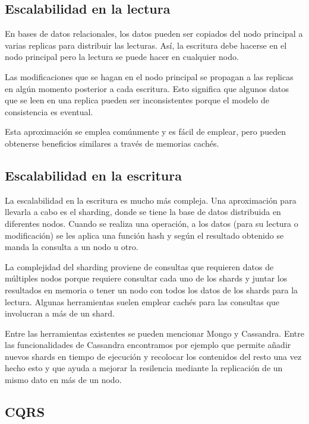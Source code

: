 \documentclass[11pt,a4paper]{article}
\begin{document}
\subsection{Escalabilidad en la lectura}

En bases de datos relacionales, los datos pueden ser copiados del nodo principal a varias replicas para distribuir las lecturas. Así, la escritura debe hacerse en el nodo principal pero la lectura se puede hacer en cualquier nodo.

Las modificaciones que se hagan en el nodo principal se propagan a las replicas en algún momento posterior a cada escritura. Esto significa que algunos datos que se leen en una replica pueden ser inconsistentes porque el modelo de consistencia es eventual.

Esta aproximación se emplea comúnmente y es fácil de emplear, pero pueden obtenerse beneficios similares a través de memorias cachés.

\subsection{Escalabilidad en la escritura}

La escalabilidad en la escritura es mucho más compleja. Una aproximación para llevarla a cabo es el sharding, donde se tiene la base de datos distribuida en diferentes nodos. Cuando se realiza una operación, a los datos (para su lectura o modificación) se les aplica una función hash y según el resultado obtenido se manda la consulta a un nodo u otro.

La complejidad del sharding proviene de consultas que requieren datos de múltiples nodos porque requiere consultar cada uno de los shards y juntar los resultados en memoria o tener un nodo con todos los datos de los shards para la lectura. Algunas herramientas suelen emplear cachés para las consultas que involucran a más de un shard.

Entre las herramientas existentes se pueden mencionar Mongo y Cassandra. Entre las funcionalidades de Cassandra encontramos por ejemplo que permite añadir nuevos shards en tiempo de ejecución y recolocar los contenidos del resto una vez hecho esto y que ayuda a mejorar la resilencia mediante la replicación de un mismo dato en más de un nodo.

\subsection{CQRS}
\end{document}
